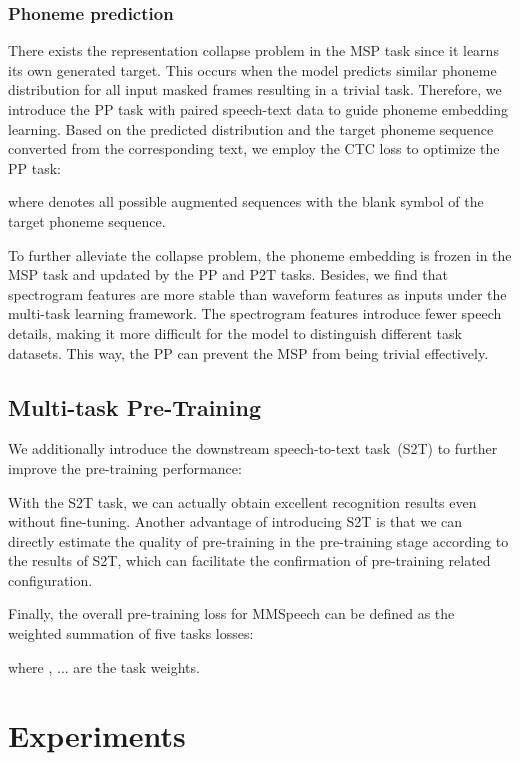 \documentclass{article}
\begin{document}
\subsubsection{Phoneme prediction}
\label{sec:PP}
There exists the representation collapse problem in the MSP task since it learns its own generated target. This occurs when the model predicts similar phoneme distribution for all input masked frames resulting in a trivial task. Therefore, we introduce the PP task with paired speech-text data to guide phoneme embedding learning. Based on the predicted distribution  and the target phoneme sequence converted from the corresponding text, we employ the CTC loss to optimize the PP task:

where  denotes all possible augmented sequences with the blank symbol of the target phoneme sequence. 

To further alleviate the collapse problem, the phoneme embedding  is frozen in the MSP task and updated by the PP and P2T tasks. Besides, we find that spectrogram features are more stable than waveform features as inputs under the multi-task learning framework. The spectrogram features introduce fewer speech details, making it more difficult for the model to distinguish different task datasets. This way, the PP can prevent the MSP from being trivial effectively. 



\subsection{Multi-task Pre-Training}
We additionally introduce the downstream speech-to-text task~(S2T) to further improve the pre-training performance:

With the S2T task, we can actually obtain excellent recognition results even without fine-tuning.
Another advantage of introducing S2T is that we can directly estimate the quality of pre-training in the pre-training stage according to the results of S2T, which can facilitate the confirmation of pre-training related configuration.

Finally, the overall pre-training loss for MMSpeech can be defined as the weighted summation of five tasks losses:

where , ...  are 
the task weights. 




 \section{Experiments}
\label{sec:exp}
\end{document}
